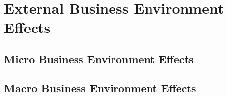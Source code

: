 \section{External Business Environment Effects}
\subsection{Micro Business Environment Effects}






\subsection{Macro Business Environment Effects} \label{macro}





